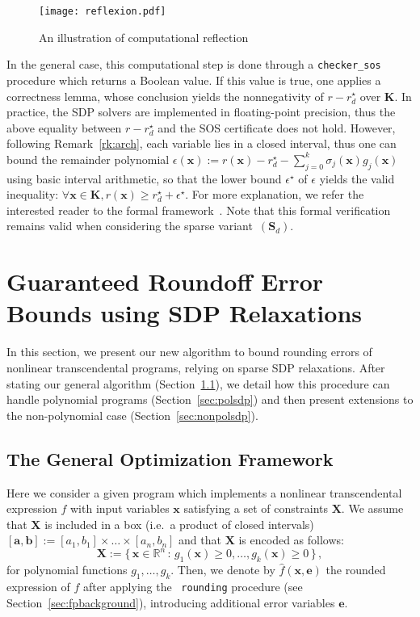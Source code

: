 \documentclass[preprint,fleqn,nocopyrightspace]{sigplanconf}
\newcommand{\code}[1]{\lstinline{#1}}
\newcommand{\R}{\mathbb{R}}
\newcommand{\x}{\mathbf{x}}
\newcommand{\e}{\mathbf{e}}
\renewcommand{\b}{\mathbf{b}}
\def\a{\mathbf{a}}
\def\S{\mathbf{S}}
\def\K{\mathbf{K}}
\def\S{\mathbf{S}}
\def\X{\mathbf{X}}
\theoremstyle{plain}
\begin{document}
\fi
%
\begin{figure}[!ht]
\centering
\texttt{[image: reflexion.pdf]}
\caption{An illustration of computational reflection}	
\label{fig:reflexion}
\end{figure}
%
In the general case, this computational step is done through a \code{checker_sos} procedure which returns a Boolean value. If this value is true, one applies a correctness lemma, whose conclusion yields the nonnegativity of $r - r_d^\star$ over $\K$.
In practice, the SDP solvers are implemented in floating-point precision, thus the above equality between $r - r_d^\star$ and the SOS certificate does not hold. However, following Remark~\ref{rk:arch}, each variable lies in a closed interval, thus one can bound the remainder polynomial $\epsilon(\x) := r(\x) - r_d^\star - \sum_{j=0}^k \sigma_j(\x) g_j(\x)$ using basic interval arithmetic, so that the lower bound $\epsilon^\star$ of $\epsilon$ yields the valid inequality: $\forall \x \in \K, r(\x) \geq r_d^\star + \epsilon^\star$.
For more explanation, we refer the interested reader to the formal framework~\cite{jfr14}. Note that this formal verification remains valid when considering the sparse variant~$(\S_d)$.
%
\vspace*{-0.2cm}
\section{Guaranteed Roundoff Error Bounds using SDP Relaxations}
\label{sec:fpsdp}
In this section, we present our new algorithm to bound rounding errors of nonlinear transcendental programs, relying on sparse SDP relaxations. After stating our general algorithm (Section~\ref{sec:transcsdp}), we detail how this procedure can handle polynomial programs (Section~\ref{sec:polsdp}) and then present extensions to the non-polynomial case (Section~\ref{sec:nonpolsdp}).
\vspace*{-0.2cm}
\subsection{The General Optimization Framework}
\label{sec:transcsdp}
%
Here we consider a given program which implements a nonlinear transcendental expression $f$ with input variables $\x$ satisfying a set of constraints $\X$. We assume that  $\X$ is included in a box (i.e.~a product of closed intervals) $[\a, \b] := [a_1, b_1] \times \dots \times [a_n, b_n]$ and that $\X$ is encoded as follows: 
\[ 
\X := \{\, \x \in \R^n \, : \, g_1 (\x) \geq 0, \dots, g_{k} (\x) \geq 0 \,\} \,,
\]
for polynomial functions $g_1, \dots, g_k$. 
%
Then, we denote by $\hat{f}(\x,\e)$ the rounded expression of $f$ after applying the ~\lstinline|rounding| procedure (see Section~\ref{sec:fpbackground}), introducing additional error variables $\e$. 
\end{document}
